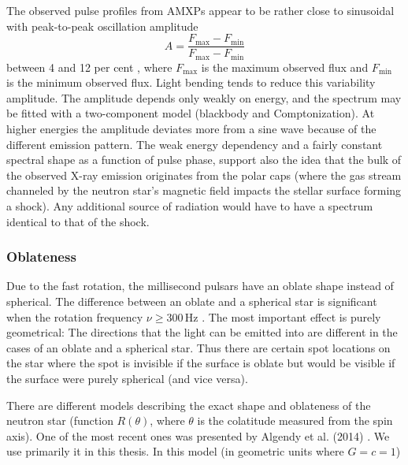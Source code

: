 \documentclass{wihuri}
\def\be{\begin{equation}}
\def\ee{\end{equation}}
\begin{document}
The observed pulse profiles from AMXPs appear to be rather close to sinusoidal with peak-to-peak oscillation amplitude 
\be \label{eq:amplitude}
A = \frac{F_{\mathrm{max}} - F_{\mathrm{min}}} {F_{\mathrm{max}} - F_{\mathrm{min}}}
\ee %
 between 4 and 12 per cent \cite{poutarew2006}, where $F_{\mathrm{max}}$ is the maximum observed flux and $F_{\mathrm{min}}$ is the minimum observed flux. Light bending tends %
to reduce this variability amplitude. The amplitude depends only weakly on energy, and the spectrum may be fitted with a two-component model (blackbody and Comptonization). At higher energies the amplitude deviates more from a sine wave because of the different emission pattern. The weak energy dependency and a fairly constant spectral shape as a function of pulse phase, support also the idea that the bulk of the observed X-ray emission originates from the polar caps (where the gas stream channeled by the neutron star's magnetic field impacts the stellar surface forming a shock). Any additional source of radiation would have to have a spectrum identical to that of the shock.


\subsubsection{Oblateness}

Due to the fast rotation, the millisecond pulsars have an oblate shape instead of spherical. The difference between an oblate and a spherical star is significant when the rotation frequency $\nu \ge 300 \, \mathrm{Hz}$ \cite{cadeau}%
. The most important effect is purely geometrical: The directions that the light can be emitted into are different in the cases of an oblate and a spherical star. Thus there are certain spot locations on the star where the spot is invisible if the surface is oblate but would be visible if the surface were purely spherical (and vice versa).


There are different models describing the exact shape and oblateness of the neutron star (function $R(\theta)$, where $\theta$ is the colatitude measured from the spin axis).
One of the most recent ones was presented by Algendy et al. (2014) \cite{algendy}. 
We use primarily it in this thesis. In this model (in geometric units
where $G = c = 1$)
\end{document}
